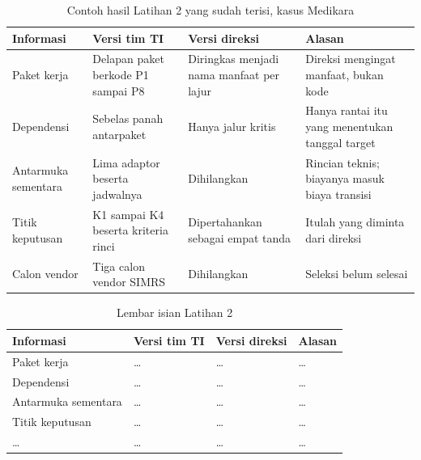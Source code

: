 \begin{table}[!htb]
  \centering
  \caption{Contoh hasil Latihan 2 yang sudah terisi, kasus Medikara}
  \label{tab:ch12-lat2-contoh}
  \begin{tabularx}{\textwidth}{>{\raggedright\arraybackslash}p{2.2cm}
                               >{\raggedright\arraybackslash}p{2.6cm}
                               >{\raggedright\arraybackslash}p{2.2cm}
                               >{\raggedright\arraybackslash}X}
    \hline
    \textbf{Informasi} & \textbf{Versi tim TI} & \textbf{Versi direksi} &
      \textbf{Alasan} \\
    \hline
    Paket kerja & Delapan paket berkode P1 sampai P8 & Diringkas menjadi nama
      manfaat per lajur & Direksi mengingat manfaat, bukan kode \\
    \hline
    De\-pen\-den\-si & Sebelas panah antarpaket & Hanya jalur kritis &
      Hanya rantai itu yang menentukan tanggal target \\
    \hline
    Antarmuka sementara & Lima adaptor beserta jadwalnya & Dihilangkan &
      Rincian teknis; biayanya masuk biaya transisi \\
    \hline
    Titik keputusan & K1 sampai K4 beserta kriteria rinci & Di\-per\-ta\-han\-kan
      sebagai empat tanda & Itulah yang diminta dari direksi \\
    \hline
    Calon vendor & Tiga calon vendor SIMRS & Dihilangkan & Seleksi belum
      selesai \\
    \hline
  \end{tabularx}
\end{table}

\begin{table}[!htb]
  \centering
  \caption{Lembar isian Latihan 2}
  \label{tab:ch12-lat2-hasil}
  \begin{tabularx}{\textwidth}{>{\raggedright\arraybackslash}p{2.2cm}
                               >{\raggedright\arraybackslash}p{2.6cm}
                               >{\raggedright\arraybackslash}p{2.2cm}
                               >{\raggedright\arraybackslash}X}
    \hline
    \textbf{Informasi} & \textbf{Versi tim TI} & \textbf{Versi direksi} &
      \textbf{Alasan} \\
    \hline
    Paket kerja & \dots & \dots & \dots \\
    \hline
    De\-pen\-den\-si & \dots & \dots & \dots \\
    \hline
    Antarmuka sementara & \dots & \dots & \dots \\
    \hline
    Titik keputusan & \dots & \dots & \dots \\
    \hline
    \dots & \dots & \dots & \dots \\
    \hline
  \end{tabularx}
\end{table}

